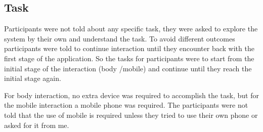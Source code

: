 \subsection{Task}
Participants were not told about any specific task, they were asked to explore the system by their own and understand the task. To avoid different outcomes participants were told to continue interaction until they encounter back with the first stage of the application. So the tasks for participants were to start from the initial stage of the interaction (body /mobile) and continue until they reach the initial stage again.

For body interaction, no extra device was required to accomplish the task, but for the mobile interaction a mobile phone was required. The participants were not told that the use of mobile is required unless they tried to use their own phone or asked for it from me.


